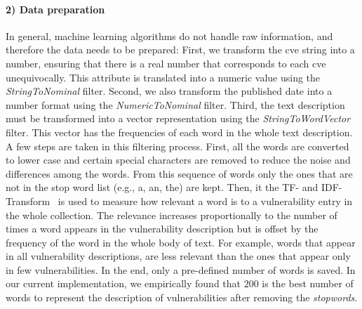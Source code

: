 \paragraph{2) Data preparation}
In general, machine learning algorithms do not handle raw information, and therefore the data needs to be prepared:
First, we transform the \gls{cve} string into a number, ensuring that there is a real number that corresponds to each \gls{cve} unequivocally. 
This attribute is translated into a numeric value using the \emph{StringToNominal} filter. 
Second, we also transform the published date into a number format using the \emph{NumericToNominal} filter.
Third, the text description must be transformed into a vector representation using the \emph{StringToWordVector} filter.
This vector has the frequencies of each word in the whole text description. 
A few steps are taken in this filtering process. 
First, all the words are converted to lower case and certain special characters are removed to reduce the noise and differences among the words. 
From this sequence of words only the ones that are not in the stop word list (e.g., a, an, the) are kept.
Then, it the TF- and IDF-Transform~\cite{Leskovec:2014} is used to measure how relevant a word is to a vulnerability entry in the whole collection. 
The relevance increases proportionally to the number of times a word appears in the vulnerability description but is offset by the frequency of the word in the whole body of text. 
For example, words that appear in all vulnerability descriptions, are less relevant than the ones that appear only in few vulnerabilities.
In the end, only a pre-defined number of words is saved. 
In our current implementation, we empirically found that $200$ is the best number of words to represent the description of vulnerabilities after removing the \emph{stopwords}.

